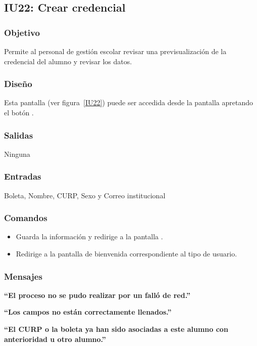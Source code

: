 
\subsection{IU22: Crear credencial}

\subsubsection{Objetivo}
   Permite al personal de gestión escolar revisar una previsualización de la credencial del alumno y revisar los datos.
\subsubsection{Diseño}
    Esta pantalla  (ver figura~\ref{IU22}) puede ser accedida desde la pantalla  apretando el botón .


\subsubsection{Salidas}
Ninguna
\subsubsection{Entradas}
    Boleta, Nombre, CURP, Sexo y Correo institucional
\subsubsection{Comandos}
\begin{itemize}
\item {} Guarda la información y redirige a la pantalla .
    \item {} Redirige a la pantalla de bienvenida correspondiente al tipo de usuario.
    
\end{itemize}

\subsubsection{Mensajes}

\begin{Citemize}
    \item {\bf  ``El proceso no se pudo realizar por un falló de red.''}
    \item {\bf``Los campos no están correctamente llenados.''}
    \item {\bf``El CURP o la boleta ya han sido asociadas a este alumno con anterioridad u otro alumno.''}
\end{Citemize}
